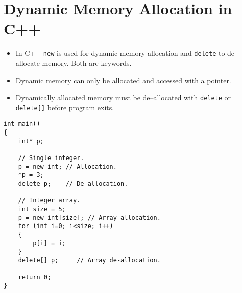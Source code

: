 \documentclass[12pt,a4paper]{article}
\begin{document}
\section{Dynamic Memory Allocation in C++}
\begin{itemize}
\item In C++ \verb|new| is used for dynamic memory allocation and \verb|delete| to de--allocate memory. Both are keywords.
\item Dynamic memory can only be allocated and accessed with a pointer.
\item Dynamically allocated memory must be de--allocated with \verb|delete| or \verb|delete[]| before program exits.
\end{itemize}
\begin{lstlisting}[caption={Dynamic memory allocation with pointer}]
int main()
{
	int* p;
	
	// Single integer.
	p = new int; // Allocation.
	*p = 3;
	delete p;    // De-allocation.
	
	// Integer array.
	int size = 5;
	p = new int[size]; // Array allocation.
	for (int i=0; i<size; i++)
	{
		p[i] = i;
	}		
	delete[] p;     // Array de-allocation.
	
	return 0;
}
\end{lstlisting}
\end{document}
